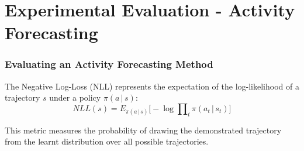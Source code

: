 \section{Experimental Evaluation - Activity Forecasting}

\logo
{
	\vspace{199.1pt}
}

\begin{frame}
	\frametitle{Evaluating an Activity Forecasting Method}
	
	\Large
	
	\vspace{0.45cm}
	
	The Negative Log-Loss (NLL) represents the expectation of the log-likelihood of a trajectory $ s $
	under a policy $ \pi(a \, | \, s) $:
	\vspace{-0.1cm}
	\begin{equation*}
		NLL(s) = E_{\pi(a \, | \, s)} \Big [ -\log \prod\nolimits_t \pi(a_t \, | \, s_t)  \Big ]
	\end{equation*}
	
	\vspace{0.1cm}
	
	This metric measures the probability of drawing the demonstrated trajectory from the learnt
	distribution over all possible trajectories. \\
\end{frame}

